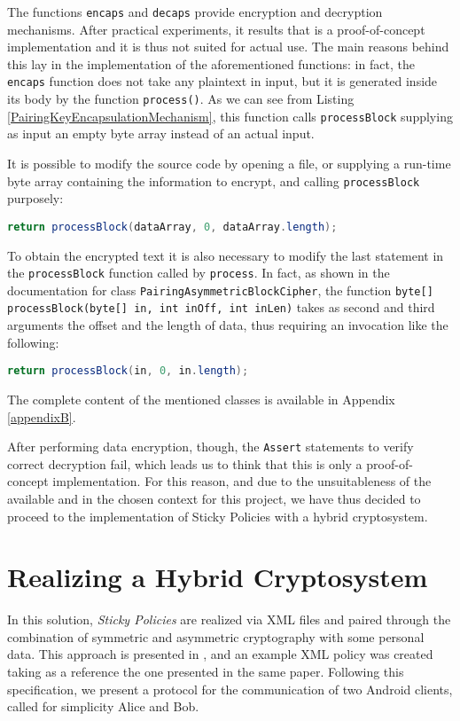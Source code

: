The functions \texttt{encaps} and \texttt{decaps} provide encryption and decryption mechanisms. After practical experiments, it results that \cite{ISCC:DecIov11} is a proof-of-concept implementation and it is thus not suited for actual use. The main reasons behind this lay in the implementation of the aforementioned functions: in fact, the \texttt{encaps} function does not take any plaintext in input, but it is generated inside its body by the function \texttt{process()}. As we can see from Listing \ref{PairingKeyEncapsulationMechanism}, this function calls \texttt{processBlock} supplying as input an empty byte array instead of an actual input.



It is possible to modify the source code by opening a file, or supplying a run-time byte array containing the information to encrypt, and calling \texttt{processBlock} purposely:

\lstinline[language=java]!return processBlock(dataArray, 0, dataArray.length);!

To obtain the encrypted text it is also necessary to modify the last statement in the \texttt{processBlock} function called by \texttt{process}. In fact, as shown in the documentation for class \texttt{PairingAsymmetricBlockCipher}, the function \texttt{byte[] processBlock(byte[] in, int inOff, int inLen)} takes as second and third arguments the offset and the length of data, thus requiring an invocation like the following:

\lstinline[language=java]!return processBlock(in, 0, in.length);!

The complete content of the mentioned classes is available in Appendix \ref{appendixB}.

After performing data encryption, though, the \texttt{Assert} statements to verify correct decryption fail, which leads us to think that this is only a proof-of-concept implementation. For this reason, and due to the unsuitableness of the available \cite{bethencourt2011library} and \cite{PBC2007Lynn} in the chosen context for this project, we have thus decided to proceed to the implementation of Sticky Policies with a hybrid cryptosystem.

\section{Realizing a Hybrid Cryptosystem}
In this solution, \textit{Sticky Policies} are realized via XML files and paired through the combination of symmetric and asymmetric cryptography with some personal data. This approach is presented in \cite{pearson2011sticky}, and an example XML policy was created taking as a reference the one presented in the same paper. Following this specification, we present a protocol for the communication of two Android clients, called for simplicity Alice and Bob. 

